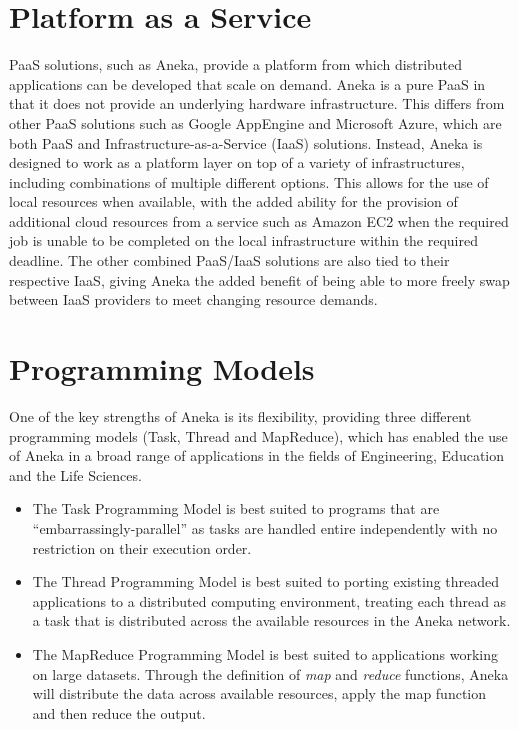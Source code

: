 \section{Platform as a Service}
PaaS solutions, such as Aneka, provide a platform from which distributed applications can be developed that scale on demand\cite{CloudBus}. Aneka is a pure PaaS in that it does not provide an underlying hardware infrastructure. This differs from other PaaS solutions such as Google AppEngine and Microsoft Azure, which are both PaaS and Infrastructure-as-a-Service (IaaS) solutions. Instead, Aneka is designed to work as a platform layer on top of a variety of infrastructures, including combinations of multiple different options. This allows for the use of local resources when available, with the added ability for the provision of additional cloud resources from a service such as Amazon EC2 when the required job is unable to be completed on the local infrastructure within the required deadline. The other combined PaaS/IaaS solutions are also tied to their respective IaaS, giving Aneka the added benefit of being able to more freely swap between IaaS providers to meet changing resource demands.

\section{Programming Models}
One of the key strengths of Aneka is its flexibility, providing three different programming models (Task, Thread and MapReduce), which has enabled the use of Aneka in a broad range of applications in the fields of Engineering, Education and the Life Sciences.
\begin{itemize}
\item The Task Programming Model is best suited to programs that are ``embarrassingly-parallel'' as tasks are handled entire independently with no restriction on their execution order\ftAnthree.
\ftAnthreeText

\item The Thread Programming Model is best suited to porting existing threaded applications to a distributed computing environment, treating each thread as a task that is distributed across the available resources in the Aneka network\ftAnfour.
\ftAnfourText

\item The MapReduce Programming Model is best suited to applications working on large datasets. Through the definition of \emph{map} and \emph{reduce} functions, Aneka will distribute the data across available resources, apply the map function and then reduce the output\ftAnfive.
\ftAnfiveText
\end{itemize}

